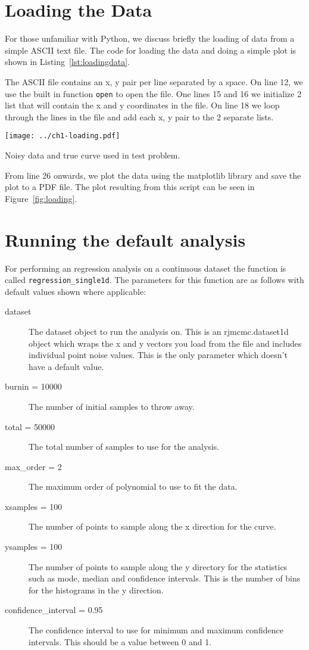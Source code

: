 \documentclass{tufte-handout}
\begin{document}
\section{Loading the Data}

For those unfamiliar with Python, we discuss briefly the loading of data
from a simple ASCII text file. The code for loading the data and doing
a simple plot is shown in Listing~\ref{lst:loadingdata}.

\lstset{caption=Loading the Data.,label=lst:loadingdata}


The ASCII file contains an x, y pair per line separated by a space. On
line 12, we use the built in function {\tt open} to open the file. One
lines 15 and 16 we initialize 2 list that will contain the x and y 
coordinates in the file. On line 18 we loop through the lines in the 
file and add each x, y pair to the 2 separate lists.

\begin{marginfigure}
\texttt{[image: ../ch1-loading.pdf]}
\caption{Noisy data and true curve used in test problem.}
\label{fig:loading}
\end{marginfigure}

From line 26 onwards, we plot the data using the matplotlib library
and save the plot to a PDF file. The plot resulting from this script
can be seen in Figure~\ref{fig:loading}.

\section{Running the default analysis}

For performing an regression analysis on a continuous dataset the function is called
{\tt regression\_single1d}. The parameters for this function are as follows with 
default values shown where applicable:

\begin{description}
\item[dataset] The dataset object to run the analysis on. This is an rjmcmc.dataset1d
object which wraps the x and y vectors you load from the file and includes individual
point noise values. This is the only parameter which doesn't have a default value.
\item[burnin = 10000] The number of initial samples to throw away.
\item[total = 50000] The total number of samples to use for the analysis.
\item[max\_order = 2] The maximum order of polynomial to use to fit the data.
\item[xsamples = 100] The number of points to sample along the x direction for the curve.
\item[ysamples = 100] The number of points to sample along the y directory for the statistics such
as mode, median and confidence intervals. This is the number of bins for the histograms in the 
y direction.
\item[confidence\_interval = 0.95] The confidence interval to use for minimum and maximum confidence
intervals. This should be a value between 0 and 1.
\end{description}
\end{document}
